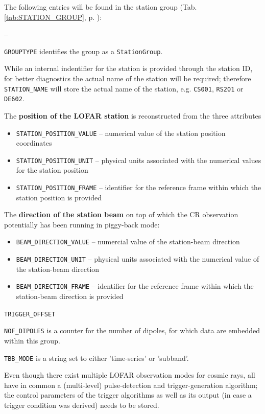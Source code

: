 \documentclass[a4paper,10pt,bibtotoc]{scrartcl}
\begin{document}
The following entries will be found in the station group (Tab.
\ref{tab:STATION_GROUP}, p. \pageref{tab:STATION_GROUP}):
\begin{list}{\textbf{--}}{}
\item \verb|GROUPTYPE| identifies the group as a \verb|StationGroup|.
\item While an internal indentifier for the station is provided
  through the station ID, for better diagnostics the actual name of
  the station will be required; therefore \verb|STATION_NAME| will
  store the actual name of the station, e.g. \texttt{CS001},
  \texttt{RS201} or \texttt{DE602}.
\item The \textbf{position of the LOFAR station} is reconstructed from the three
  attributes
  \begin{itemize} \parskip 0pt
  \item \verb|STATION_POSITION_VALUE| -- numerical value of the station position
    coordinates
  \item \verb|STATION_POSITION_UNIT| -- physical units associated with the numerical
    values for the station position
  \item \verb|STATION_POSITION_FRAME| -- identifier for the reference frame within
    which the station position is provided
  \end{itemize}
\item The \textbf{direction of the station beam} on top of which the CR observation
  potentially has been running in piggy-back mode:
  \begin{itemize} \parskip 0pt
  \item \verb|BEAM_DIRECTION_VALUE| -- numercial value of the station-beam
    direction
  \item \verb|BEAM_DIRECTION_UNIT| -- physical units associated with the numerical
    value of the station-beam direction
  \item \verb|BEAM_DIRECTION_FRAME| -- identifier for the reference frame within
    which the station-beam direction is provided
  \end{itemize}
\item \verb|TRIGGER_OFFSET|
\item \verb|NOF_DIPOLES| is a counter for the number of dipoles, for which data
  are embedded within this group.
\item \verb|TBB_MODE| is a string set to either 'time-series' or 'subband'.
\end{list}

Even though there exist multiple LOFAR observation modes for cosmic rays, all 
have in common a (multi-level) pulse-detection and trigger-generation algorithm;
the control parameters of the trigger algorithms as well as its output (in case
a trigger condition was derived) needs to be stored.
\end{document}
